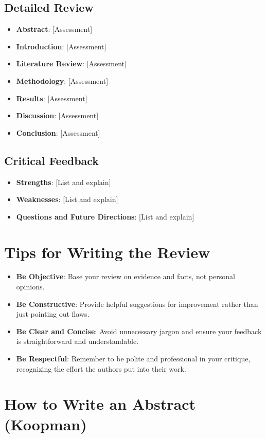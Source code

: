 \documentclass[12pt]{article}
\begin{document}
\subsection{Detailed Review}
\begin{itemize}
    \item \textbf{Abstract}: [Assessment]
    \item \textbf{Introduction}: [Assessment]
    \item \textbf{Literature Review}: [Assessment]
    \item \textbf{Methodology}: [Assessment]
    \item \textbf{Results}: [Assessment]
    \item \textbf{Discussion}: [Assessment]
    \item \textbf{Conclusion}: [Assessment]
\end{itemize}

\subsection{Critical Feedback}
\begin{itemize}
    \item \textbf{Strengths}: [List and explain]
    \item \textbf{Weaknesses}: [List and explain]
    \item \textbf{Questions and Future Directions}: [List and explain]
\end{itemize}

\section{Tips for Writing the Review}
\begin{itemize}
    \item \textbf{Be Objective}: Base your review on evidence and facts, not personal opinions.
    \item \textbf{Be Constructive}: Provide helpful suggestions for improvement rather than just pointing out flaws.
    \item \textbf{Be Clear and Concise}: Avoid unnecessary jargon and ensure your feedback is straightforward and understandable.
    \item \textbf{Be Respectful}: Remember to be polite and professional in your critique, recognizing the effort the authors put into their work.
\end{itemize}

\section{How to Write an Abstract (Koopman)}
\end{document}
